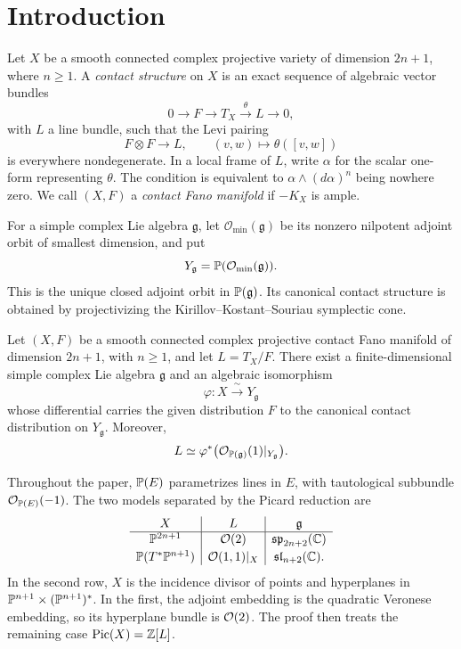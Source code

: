 \section{Introduction}\label{sec:introduction}

Let $X$ be a smooth connected complex projective variety of dimension
$2n+1$, where $n\geq1$. A \emph{contact structure} on $X$ is an exact
sequence of algebraic vector bundles
\begin{equation}\label{intro:contact-sequence}
 0\longrightarrow F\longrightarrow T_X
 \xrightarrow{\ \theta\ }L\longrightarrow0,
\end{equation}
with $L$ a line bundle, such that the Levi pairing
\[
 F\otimes F\longrightarrow L,
 \qquad (v,w)\longmapsto\theta([v,w])
\]
is everywhere nondegenerate. In a local frame of $L$, write $\alpha$
for the scalar one-form representing $\theta$. The condition is
equivalent to $\alpha\wedge(d\alpha)^n$ being nowhere zero. We call
$(X,F)$ a \emph{contact Fano manifold} if $-K_X$ is ample.

For a simple complex Lie algebra $\mathfrak g$, let
$\mathcal O_{\min}(\mathfrak g)$ be its nonzero nilpotent adjoint orbit
of smallest dimension, and put
\[
 Y_{\mathfrak g}=\mathbb P(\mathcal O_{\min}(\mathfrak g)).
\]
This is the unique closed adjoint orbit in $\mathbb P(\mathfrak g)$. Its
canonical contact structure is obtained by projectivizing the
Kirillov--Kostant--Souriau symplectic cone.

\begin{theorem}\label{thm:main}
Let $(X,F)$ be a smooth connected complex projective contact Fano
manifold of dimension $2n+1$, with $n\geq1$, and let $L=T_X/F$.
There exist a finite-dimensional simple complex Lie algebra
$\mathfrak g$ and an algebraic isomorphism
\[
 \varphi:X\xrightarrow{\ \sim\ }Y_{\mathfrak g}
\]
whose differential carries the given distribution $F$ to the canonical
contact distribution on $Y_{\mathfrak g}$. Moreover,
\[
 L\simeq\varphi^*\bigl(\mathcal O_{\mathbb P(\mathfrak g)}(1)|_{Y_{\mathfrak g}}\bigr).
\]
\end{theorem}

Throughout the paper, $\mathbb P(E)$ parametrizes lines in $E$, with
tautological subbundle $\mathcal O_{\mathbb P(E)}(-1)$. The two models separated
by the Picard reduction are
\[
 \begin{array}{c|c|c}
 X&L&\mathfrak g\\ \hline
 \mathbb P^{2n+1}&\mathcal O(2)&\mathfrak{sp}_{2n+2}(\mathbb C)\\[2pt]
 \mathbb P(T^*\mathbb P^{n+1})&\mathcal O(1,1)|_X&\mathfrak{sl}_{n+2}(\mathbb C).
 \end{array}
\]
In the second row, $X$ is the incidence divisor of points and
hyperplanes in $\mathbb P^{n+1}\times(\mathbb P^{n+1})^*$. In the first, the
adjoint embedding is the quadratic Veronese embedding, so its
hyperplane bundle is $\mathcal O(2)$. The proof then treats the remaining
case $\operatorname{Pic}(X)=\mathbb Z[L]$.

